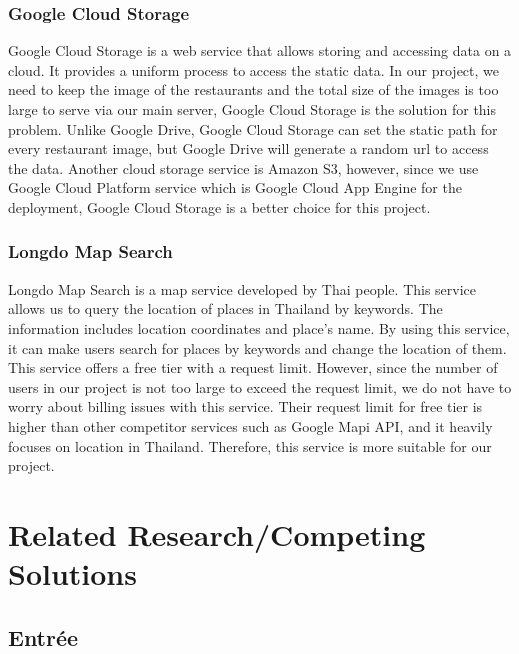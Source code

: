 \documentclass[12pt,oneside,openright,a4paper]{cpe-english-project}
\begin{document}
\subsubsection{Google Cloud Storage}

Google Cloud Storage is a web service that allows storing and accessing data on a cloud. It provides a uniform process to access the static data. In our project, we need to keep the image of the restaurants and the total size of the images is too large to serve via our main server, Google Cloud Storage is the solution for this problem. Unlike Google Drive, Google Cloud Storage can set the static path for every restaurant image, but Google Drive will generate a random url to access the data. Another cloud storage service is Amazon S3, however, since we use Google Cloud Platform service which is Google Cloud App Engine for the deployment, Google Cloud Storage is a better choice for this project.

\subsubsection{Longdo Map Search}

Longdo Map Search is a map service developed by Thai people. This service allows us to query the location of places in Thailand by keywords. The information includes location coordinates and place’s name. By using this service, it can make users search for places by keywords and change the location of them. This service offers a free tier with a request limit. However, since the number of users in our project is not too large to exceed the request limit, we do not have to worry about billing issues with this service. Their request limit for free tier is higher than other competitor services such as Google Mapi API, and it heavily focuses on location in Thailand. Therefore, this service is more suitable for our project.

\section{Related Research/Competing Solutions}

\subsection{Entrée}
\end{document}
